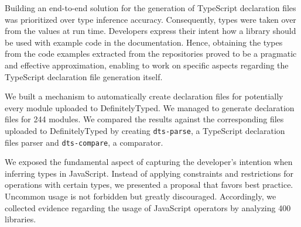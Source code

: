 \documentclass[english,cleveref,autoref,submission]{programming}
\newenvironment{changethis}{%
  \begin{tcolorbox}[breakable,notitle,boxrule=0pt,colback=blue!20,colframe=blue!20]}{%
  \end{tcolorbox}}
\begin{document}
Building an end-to-end solution for the generation of TypeScript declaration files was
prioritized over type inference accuracy. Consequently, types were taken over from the
values at run time. Developers express their intent how a library should be used with
example code in the documentation. Hence,
obtaining the types from the code examples extracted from the repositories proved to be a
pragmatic and effective approximation, enabling to work on specific aspects regarding the
TypeScript declaration file generation itself.

We built a mechanism to automatically create declaration files for potentially every
module uploaded to DefinitelyTyped. We managed to generate declaration files for 244
modules. We compared the results against the corresponding files uploaded to
DefinitelyTyped by creating \texttt{dts-parse}, a TypeScript declaration files parser and
\texttt{dts-compare}, a comparator.

\begin{changethis}
  We exposed the fundamental aspect of capturing the developer's intention when inferring
  types in JavaScript. Instead of applying constraints and restrictions for operations
  with certain types, we presented a proposal that favors best practice. Uncommon usage is
  not forbidden but greatly discouraged. Accordingly, we collected evidence regarding the
  usage of JavaScript operators by analyzing 400 libraries.
\end{changethis}

\printbibliography
\end{document}
